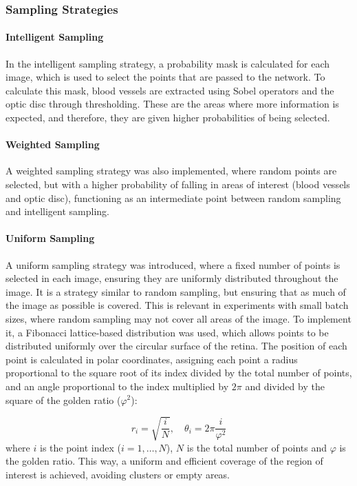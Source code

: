 \subsubsection{Sampling Strategies}
\label{subsubsec:estratexias_mostraxe}

\paragraph{Intelligent Sampling}
In the intelligent sampling strategy, a probability mask is calculated for each image, which is used to select the points that are passed to the network. To calculate this mask, blood vessels are extracted using Sobel operators and the optic disc through thresholding. These are the areas where more information is expected, and therefore, they are given higher probabilities of being selected.

\paragraph{Weighted Sampling}
A weighted sampling strategy was also implemented, where random points are selected, but with a higher probability of falling in areas of interest (blood vessels and optic disc), functioning as an intermediate point between random sampling and intelligent sampling.

\paragraph{Uniform Sampling}
A uniform sampling strategy was introduced, where a fixed number of points is selected in each image, ensuring they are uniformly distributed throughout the image. It is a strategy similar to random sampling, but ensuring that as much of the image as possible is covered. This is relevant in experiments with small batch sizes, where random sampling may not cover all areas of the image. To implement it, a Fibonacci lattice-based distribution was used, which allows points to be distributed uniformly over the circular surface of the retina. The position of each point is calculated in polar coordinates, assigning each point a radius proportional to the square root of its index divided by the total number of points, and an angle proportional to the index multiplied by $2\pi$ and divided by the square of the golden ratio ($\varphi^2$):

\[
r_i = \sqrt{\frac{i}{N}}, \quad \theta_i = 2\pi \frac{i}{\varphi^2}
\]
where $i$ is the point index ($i = 1, \dots, N$), $N$ is the total number of points and $\varphi$ is the golden ratio. This way, a uniform and efficient coverage of the region of interest is achieved, avoiding clusters or empty areas.

